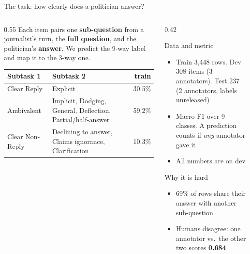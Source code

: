 \documentclass[aspectratio=169,10pt]{beamer}
\newcommand{\hl}[1]{\textcolor{accent}{\textbf{#1}}}
\begin{document}
\begin{frame}{The task: how clearly does a politician answer?}
  \begin{columns}[T]
    \begin{column}{0.55\textwidth}
      Each item pairs one \textbf{sub-question} from a journalist's turn, the \textbf{full question}, and the
      politician's \textbf{answer}. We predict the 9-way label and map it to the 3-way one.
      \vspace{6pt}

      {\small
      \begin{tabular}{@{}>{\raggedright\arraybackslash}p{2.3cm}>{\raggedright\arraybackslash}p{3.7cm}r@{}}
        \toprule
        Subtask 1 & Subtask 2 & train \\
        \midrule
        Clear Reply & Explicit & 30.5\% \\
        Ambivalent & Implicit, Dodging, General, Deflection, Partial/half-answer & 59.2\% \\
        Clear Non-Reply & Declining to answer, Claims ignorance, Clarification & 10.3\% \\
        \bottomrule
      \end{tabular}}
    \end{column}
    \begin{column}{0.42\textwidth}
      \begin{block}{Data and metric}
        \small
        \begin{itemize}
          \item Train 3,448 rows. Dev 308 items (3 annotators). Test 237 (2 annotators, labels unreleased)
          \item Macro-F1 over 9 classes. A prediction counts if \emph{any} annotator gave it
          \item All numbers are on dev
        \end{itemize}
      \end{block}
      \begin{block}{Why it is hard}
        \small
        \begin{itemize}
          \item 69\% of rows share their answer with another sub-question
          \item Humans disagree: one annotator vs.\ the other two scores \hl{0.684}
        \end{itemize}
      \end{block}
    \end{column}
  \end{columns}
\end{frame}
\end{document}
